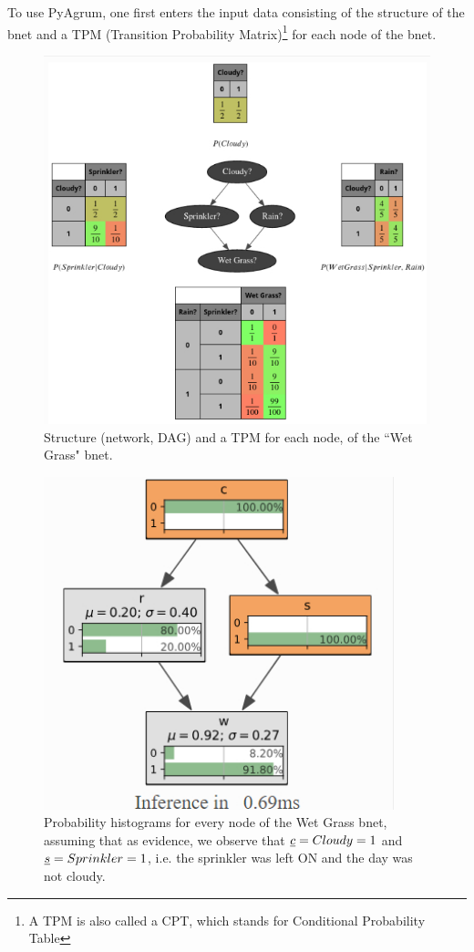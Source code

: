 To use PyAgrum, one first enters the input data consisting of the structure of the bnet and a TPM (Transition Probability Matrix)\footnote{A TPM is also called
a CPT, which stands for Conditional Probability Table}
for each node of the bnet.


\begin{figure}[h!]
\centering
\includegraphics[width=6in]
{bnet-apps/wet-grass-bnet}
\caption{Structure (network, DAG) and a TPM for each node, of the ``Wet Grass" 
bnet.}
\label{fig-wet-grass-bnet}
\end{figure}


\begin{figure}[h!]
\centering
\includegraphics[width=4in]
{bnet-apps/wet-grass-evidence}
\caption{Probability histograms for every node of the Wet Grass bnet,
assuming that as evidence, we observe that ${\underline{c}}=Cloudy=1$ and ${\underline{s}}=Sprinkler=1$, i.e. the sprinkler was left ON and the day was not cloudy.}
\label{fig-wet-grass-evidence}
\end{figure}


